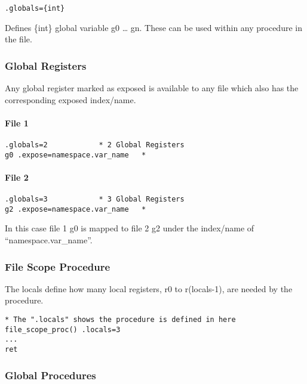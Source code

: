 \begin{verbatim}
.globals={int}
\end{verbatim}

Defines \{int\} global variable g0 \ldots{} gn. These can be used within
any procedure in the file.

\hypertarget{global-registers}{%
\subsubsection{Global Registers}\label{global-registers}}

Any global register marked as exposed is available to any file which
also has the corresponding exposed index/name.

\hypertarget{file-1}{%
\paragraph{File 1}\label{file-1}}

\begin{verbatim}
.globals=2            * 2 Global Registers
g0 .expose=namespace.var_name   * 
\end{verbatim}

\hypertarget{file-2}{%
\paragraph{File 2}\label{file-2}}

\begin{verbatim}
.globals=3            * 3 Global Registers
g2 .expose=namespace.var_name   * 
\end{verbatim}

In this case file 1 g0 is mapped to file 2 g2 under the index/name of
``namespace.var\_name''.

\hypertarget{file-scope-procedure}{%
\subsubsection{File Scope Procedure}\label{file-scope-procedure}}

The locals define how many local registers, r0 to r(locals-1), are
needed by the procedure.

\begin{verbatim}
* The ".locals" shows the procedure is defined in here
file_scope_proc() .locals=3
...
ret
\end{verbatim}

\hypertarget{global-procedures}{%
\subsubsection{Global Procedures}\label{global-procedures}}

